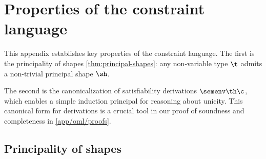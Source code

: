 \documentclass[acmsmall,screen,nonacm%
\Anonymous{,anonymous}{}%
\Final{}{,review}%
]{acmart}
\begin{document}
\section{Properties of the constraint language}
\label{app:proofs-constraints}

This appendix establishes key properties of the constraint language. The first
is the principality of shapes \cref{thm:principal-shapes}: any non-variable type
$\t$ admits a non-trivial principal shape $\sh$.

The second is the canonicalization of satisfiability derivations $\semenv \th
\c$, which enables a simple induction principal for reasoning about unicity.
This canonical form for derivations is a crucial tool in our proof of
soundness and completeness in \cref{app/oml/proofs}.

\subsection{Principality of shapes}
\end{document}
